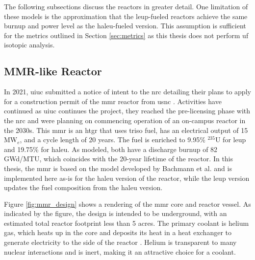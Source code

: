 The following subsections discuss the reactors in greater detail. One limitation of these models is the approximation that the \gls{leup}-fueled reactors achieve the same burnup and power level as the \gls{haleu}-fueled version. This assumption is sufficient for the metrics outlined in Section \ref{sec:metrics} as this thesis does not perform \gls{uf} isotopic analysis.

\subsection{MMR-like Reactor}
\label{sec:mmr}

In 2021, \gls{uiuc} submitted a notice of intent to the \gls{nrc} detailing their plans to apply for a construction permit of the \gls{mmr} reactor from \gls{usnc} \cite{uiuc_notice_nrc_2021}. Activities have continued as \gls{uiuc} continues the project, they reached the pre-licensing phase with the \gls{nrc} and were planning on commencing operation of an on-campus reactor in the 2030s. This \gls{mmr} is an \gls{htgr} that uses \gls{triso} fuel, has an electrical output of 15 MW$_e$, and a cycle length of 20 years. The fuel is enriched to 9.95\% $^{235}$U for \gls{leup} and 19.75\% for \gls{haleu}. As modeled, both have a discharge burnup of 82 GWd/MTU, which coincides with the 20-year lifetime of the reactor. In this thesis, the \gls{mmr} is based on the model developed by Bachmann et al. \cite{bachmann_mmr_like_2023} and is implemented here as-is for the \gls{haleu} version of the reactor, while the \gls{leup} version updates the fuel composition from the \gls{haleu} version.

Figure \ref{fig:mmr_design} shows a rendering of the \gls{mmr} core and reactor vessel. As indicated by the figure, the design is intended to be underground, with an estimated total reactor footprint less than 5 acres. The primary coolant is helium gas, which heats up in the core and deposits its heat in a heat exchanger to generate electricity to the side of the reactor \cite{usnc_chalk_river}. Helium is transparent to many nuclear interactions and is inert, making it an attractive choice for a coolant.


